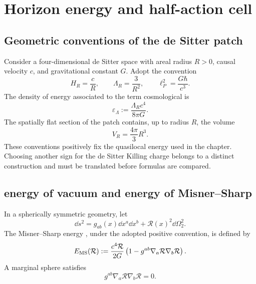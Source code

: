 \section{Horizon energy and half-action cell}
\label{rm:chap:horizonte-media-accion}

\subsection{Geometric conventions of the de Sitter patch}

Consider a four-dimensional de Sitter space with areal radius
\(R>0\), causal velocity \(c\), and gravitational constant \(G\). Adopt
the convention
\begin{equation}
 H_R=\frac cR,
 \qquad
 \Lambda_R=\frac3{R^2},
 \qquad
 \ell_P^2=\frac{G\hbar}{c^3}.
 \label{rm:eq:horizon-ds-conventions}
\end{equation}
The density of energy associated to the term cosmological is
\begin{equation}
 \varepsilon_\Lambda
 :=\frac{\Lambda_Rc^4}{8\pi G}.
 \label{rm:eq:horizon-vacuum-density}
\end{equation}
The spatially flat section of the patch contains, up to radius \(R\), the
volume
\begin{equation}
 V_R=\frac{4\pi}{3}R^3.
 \label{rm:eq:horizon-flat-volume}
\end{equation}
These conventions positively fix the quasilocal energy used in the
chapter. Choosing another sign for the de Sitter Killing charge
belongs to a distinct construction and must be translated before formulas
are compared.

\subsection{energy of vacuum and energy of Misner--Sharp}

In a spherically symmetric geometry, let
\begin{equation}
 \dd s^2=g_{ab}(x)\dd x^a\dd x^b
 +\mathcal R(x)^2\dd\Omega_2^2.
 \label{rm:eq:horizon-spherical-metric}
\end{equation}
The Misner--Sharp energy \cite{rm:MisnerSharp1964}, under the adopted positive convention, is
defined by
\begin{equation}
 E_{\rm MS}(\mathcal R)
 :=\frac{c^4\mathcal R}{2G}
 \left(1-g^{ab}\nabla_a\mathcal R\nabla_b\mathcal R\right).
 \label{rm:eq:horizon-Misner-Sharp}
\end{equation}
A marginal sphere satisfies
\begin{equation}
 g^{ab}\nabla_a\mathcal R\nabla_b\mathcal R=0.
 \label{rm:eq:horizon-marginal-sphere}
\end{equation}


